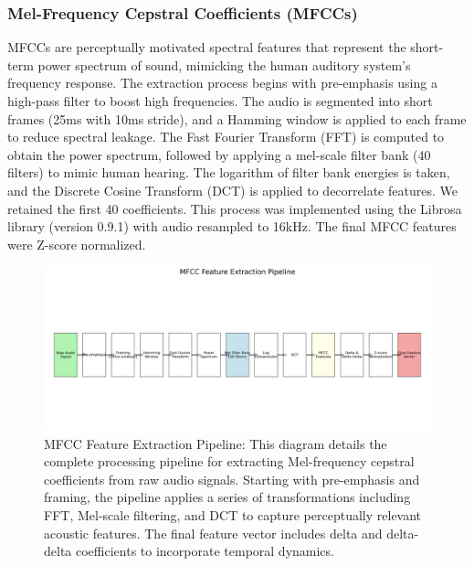 \documentclass[12pt]{article}
\begin{document}
\subsubsection{Mel-Frequency Cepstral Coefficients (MFCCs)}
MFCCs are perceptually motivated spectral features that represent the short-term power spectrum of sound, mimicking the human auditory system's frequency response. The extraction process begins with pre-emphasis using a high-pass filter to boost high frequencies. The audio is segmented into short frames (25ms with 10ms stride), and a Hamming window is applied to each frame to reduce spectral leakage. The Fast Fourier Transform (FFT) is computed to obtain the power spectrum, followed by applying a mel-scale filter bank (40 filters) to mimic human hearing. The logarithm of filter bank energies is taken, and the Discrete Cosine Transform (DCT) is applied to decorrelate features. We retained the first 40 coefficients. This process was implemented using the Librosa library (version 0.9.1) with audio resampled to 16kHz. The final MFCC features were Z-score normalized.

\begin{figure}[h]
    \centering
    \includegraphics[width=1.0\linewidth]{Figures/mfcc_pipeline.png}
    \caption{MFCC Feature Extraction Pipeline: This diagram details the complete processing pipeline for extracting Mel-frequency cepstral coefficients from raw audio signals. Starting with pre-emphasis and framing, the pipeline applies a series of transformations including FFT, Mel-scale filtering, and DCT to capture perceptually relevant acoustic features. The final feature vector includes delta and delta-delta coefficients to incorporate temporal dynamics.}
    \label{fig:mfcc_pipeline}
\end{figure}
\end{document}
